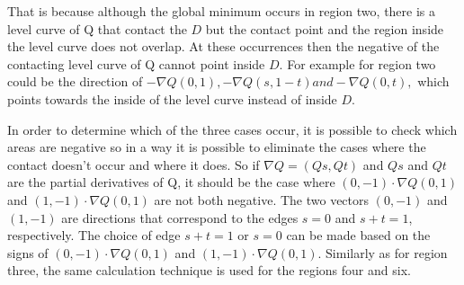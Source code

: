 That is because although the global minimum occurs in region two, there is a level curve of Q that contact the $D$ but the contact point and the region inside the level curve does not overlap. At these occurrences then the negative of the contacting level curve of Q cannot point inside $D$. For example for region two could be the direction of $-\nabla Q(0,1), -\nabla Q(s,1-t) and -\nabla Q(0,t),$ which points towards the inside of the level curve instead of inside $D$. 

In order to determine which of the three cases occur, it is possible to check which areas are negative so in a way it is possible to eliminate the cases where the contact doesn't occur and where it does. So if $\nabla Q = (Qs, Qt)$ and $Qs$ and $Qt$ are the partial derivatives of Q, it should be the case where $(0, -1) \cdot \nabla Q(0, 1)$ and $(1, -1) \cdot \nabla Q(0, 1)$ are not both  negative. The two vectors $(0, −1)$ and $(1, −1)$ are directions that correspond to the edges $s = 0$ and $s + t = 1$, respectively. The choice of edge $s+t = 1$ or $s = 0$ can be made based on the signs of $(0,-1) \cdot \nabla Q(0,1)$ and $(1, -1) \cdot \nabla Q(0, 1)$. Similarly as for region three, the same calculation technique is used for the regions four and six. 

\clearpage

